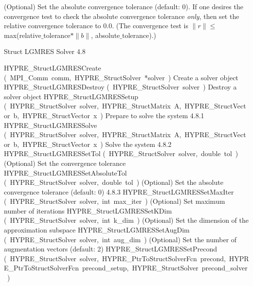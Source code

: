 \documentclass{article}
\begin{document}
\begin{cxxentry}
\begin{cxxentry}
\begin{cxxfunction}
\begin{cxxdoc}
(Optional) Set the absolute convergence tolerance (default: 0).
If one desires
the convergence test to check the absolute convergence tolerance {\it only}, then
set the relative convergence tolerance to 0.0.  (The convergence test is 
$\|r\| \leq$ max(relative$\_$tolerance$\ast \|b\|$, absolute$\_$tolerance).)
\end{cxxdoc}
\end{cxxfunction}
\end{cxxentry}
\begin{cxxentry}
{}
        {Struct LGMRES Solver}
        {}
        {
}
        {4.8}
\begin{cxxnames}
        {HYPRE\_StructLGMRESCreate}
        {(\ MPI\_Comm\ comm,\ HYPRE\_StructSolver\ *solver\ )}
        {
Create a solver object}
        {}
\label{cxx.4.8.4}
        {HYPRE\_StructLGMRESDestroy}
        {(\ HYPRE\_StructSolver\ solver\ )}
        {
Destroy a solver object}
        {}
\label{cxx.4.8.5}
        {HYPRE\_StructLGMRESSetup}
        {(\ HYPRE\_StructSolver\ solver,\ HYPRE\_StructMatrix\ A,\ HYPRE\_StructVector\ b,\ HYPRE\_StructVector\ x\ )}
        {
Prepare to solve the system}
        {4.8.1}
        {HYPRE\_StructLGMRESSolve}
        {(\ HYPRE\_StructSolver\ solver,\ HYPRE\_StructMatrix\ A,\ HYPRE\_StructVector\ b,\ HYPRE\_StructVector\ x\ )}
        {
Solve the system}
        {4.8.2}
        {HYPRE\_StructLGMRESSetTol}
        {(\ HYPRE\_StructSolver\ solver,\ double\ tol\ )}
        {
(Optional) Set the convergence tolerance}
        {}
\label{cxx.4.8.6}
        {HYPRE\_StructLGMRESSetAbsoluteTol}
        {(\ HYPRE\_StructSolver\ solver,\ double\ tol\ )}
        {
(Optional) Set the absolute convergence tolerance (default: 0) }
        {4.8.3}
        {HYPRE\_StructLGMRESSetMaxIter}
        {(\ HYPRE\_StructSolver\ solver,\ int\ max\_iter\ )}
        {
(Optional) Set maximum number of iterations}
        {}
\label{cxx.4.8.7}
        {HYPRE\_StructLGMRESSetKDim}
        {(\ HYPRE\_StructSolver\ solver,\ int\ k\_dim\ )}
        {
(Optional) Set the dimension of the approximation subspace}
        {}
\label{cxx.4.8.8}
        {HYPRE\_StructLGMRESSetAugDim}
        {(\ HYPRE\_StructSolver\ solver,\ int\ aug\_dim\ )}
        {
(Optional) Set the number of augmentation vectors  (default: 2)}
        {}
\label{cxx.4.8.9}
        {HYPRE\_StructLGMRESSetPrecond}
        {(\ HYPRE\_StructSolver\ solver,\ HYPRE\_PtrToStructSolverFcn\ precond,\ HYPRE\_PtrToStructSolverFcn\ precond\_setup,\ HYPRE\_StructSolver\ precond\_solver\ )}

\end{cxxnames}
\end{cxxentry}
\end{cxxentry}
\end{document}
